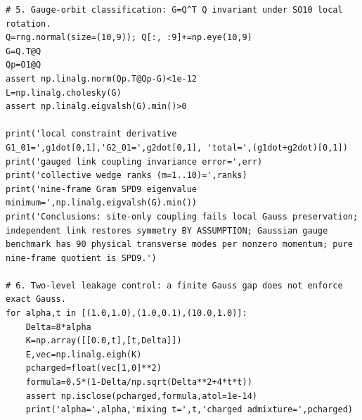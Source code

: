 \documentclass[11pt,oneside]{report}
\begin{document}
\begin{Verbatim}[breaklines=true,breakanywhere=true,fontsize=\scriptsize]
# 5. Gauge-orbit classification: G=Q^T Q invariant under SO10 local rotation.
Q=rng.normal(size=(10,9)); Q[:, :9]+=np.eye(10,9)
G=Q.T@Q
Qp=O1@Q
assert np.linalg.norm(Qp.T@Qp-G)<1e-12
L=np.linalg.cholesky(G)
assert np.linalg.eigvalsh(G).min()>0

print('local constraint derivative G1_01=',g1dot[0,1],'G2_01=',g2dot[0,1], 'total=',(g1dot+g2dot)[0,1])
print('gauged link coupling invariance error=',err)
print('collective wedge ranks (m=1..10)=',ranks)
print('nine-frame Gram SPD9 eigenvalue minimum=',np.linalg.eigvalsh(G).min())
print('Conclusions: site-only coupling fails local Gauss preservation; independent link restores symmetry BY ASSUMPTION; Gaussian gauge benchmark has 90 physical transverse modes per nonzero momentum; pure nine-frame quotient is SPD9.')

# 6. Two-level leakage control: a finite Gauss gap does not enforce exact Gauss.
for alpha,t in [(1.0,1.0),(1.0,0.1),(10.0,1.0)]:
    Delta=8*alpha
    K=np.array([[0.0,t],[t,Delta]])
    E,vec=np.linalg.eigh(K)
    pcharged=float(vec[1,0]**2)
    formula=0.5*(1-Delta/np.sqrt(Delta**2+4*t*t))
    assert np.isclose(pcharged,formula,atol=1e-14)
    print('alpha=',alpha,'mixing t=',t,'charged admixture=',pcharged)

\end{Verbatim}
\end{document}
